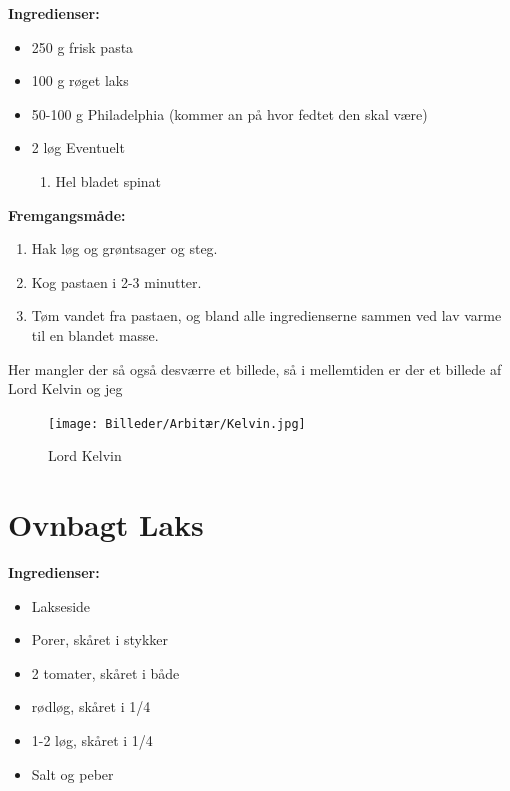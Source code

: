 \documentclass{book}
\begin{document}
\begin{minipage}[t] {0.5\textwidth}
\textbf{Ingredienser:}
    \begin{itemize}
        \item 250 g frisk pasta
        \item 100 g røget laks
        \item 50-100 g Philadelphia (kommer an på hvor fedtet den skal være)
        \item 2 løg
        Eventuelt
        \begin{enumerate}
            \item Hel bladet spinat
            
        \end{enumerate}
    \end{itemize}
\end{minipage}
\begin{minipage}[t] {0.5\textwidth}
 \textbf{Fremgangsmåde:}
 \begin{enumerate}
     \item Hak løg og grøntsager og steg.
     \item Kog pastaen i 2-3 minutter.
     \item Tøm vandet fra pastaen, og bland alle ingredienserne sammen ved lav varme til en blandet masse.
     
 \end{enumerate}
\end{minipage}
\newpage Her mangler der så også desværre et billede, så i mellemtiden er der et billede af Lord Kelvin og jeg
\begin{figure}
    \centering
    \texttt{[image: Billeder/Arbitær/Kelvin.jpg]}
    \caption{Lord Kelvin }
\end{figure}
\newpage \section{Ovnbagt Laks}
\begin{minipage}[t] {0.5\textwidth}
\textbf{Ingredienser:}
    \begin{itemize}
        \item Lakseside
        \item Porer, skåret i stykker
        \item 2 tomater, skåret i både
        \item rødløg, skåret i 1/4
        \item 1-2 løg, skåret i 1/4
        \item Salt og peber
    \end{itemize}
\end{minipage}
\end{document}

